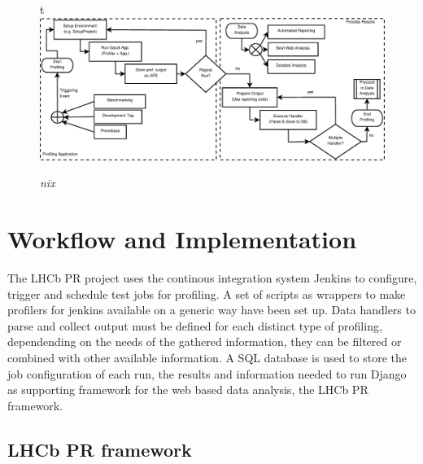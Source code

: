 \documentclass[a4paper]{jpconf}
\begin{document}
\newpage

\begin{figure}{t}
\includegraphics[scale=0.3]{figures/profiling_process.eps}
\caption{\small \textit{nix}}
\label{fig:trend}
\end{figure}

\section{Workflow and Implementation}
\label{sec:workflow_and_implementation}

The LHCb PR project uses the continous integration system Jenkins \cite{jenkins} to configure, trigger and schedule test jobs for profiling. A set of scripts as wrappers to make profilers for jenkins available on a generic way have been set up. Data handlers to parse and collect output must be defined for each distinct type of profiling, dependending on the needs of the gathered information, they can be filtered or combined with other available information. A SQL database is used to store the job configuration of each run, the results and information needed to run Django \cite{django} as supporting framework for the web based data analysis, the LHCb PR framework. 

\subsection{LHCb PR framework}
\label{sec:lhcbpr_framework}
\end{document}
